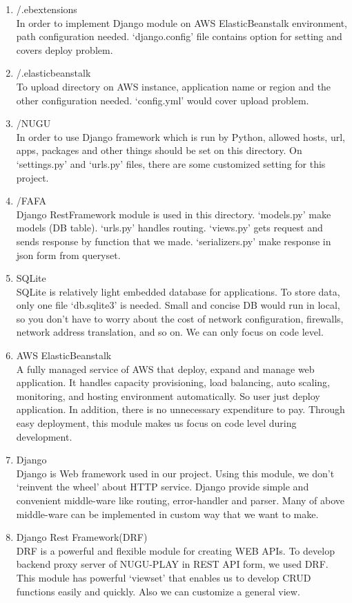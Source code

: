 \documentclass[conference]{IEEEtran}
\begin{document}
\begin{enumerate}
    \item /.ebextensions\\
    In order to implement Django module on AWS ElasticBeanstalk environment, path configuration needed. ‘django.config’ file contains option for setting and covers deploy problem.\\
    \item /.elasticbeanstalk\\
    To upload directory on AWS instance, application name or region and the other configuration needed. ‘config.yml’ would cover upload problem.\\
    \item /NUGU\\
    In order to use Django framework which is run by Python, allowed hosts, url, apps, packages and other things should be set on this directory. On ‘settings.py’ and ‘urls.py’ files, there are some customized setting for this project.\\
    \item /FAFA\\
    Django RestFramework module is used in this directory. ‘models.py’ make models (DB table). ‘urls.py’ handles routing. ‘views.py’ gets request and sends response by function that we made. ‘serializers.py’ make response in json form from queryset.\\
    \item SQLite\\
    SQLite is relatively light embedded database for applications. To store data, only one file ‘db.sqlite3’ is needed. Small and concise DB would run in local, so you don’t have to worry about the cost of network configuration, firewalls, network address translation, and so on. We can only focus on code level.\\
    \item AWS ElasticBeanstalk\\
    A fully managed service of AWS that deploy, expand and manage web application. It handles capacity provisioning, load balancing, auto scaling, monitoring, and hosting environment automatically. So user just deploy application. In addition, there is no unnecessary expenditure to pay. Through easy deployment, this module makes us focus on code level during development. \\
    \item Django\\
    Django is Web framework used in our project. Using this module, we don’t ‘reinvent the wheel’ about HTTP service. Django provide simple and convenient middle-ware like routing, error-handler and parser. Many of above middle-ware can be implemented in custom way that we want to make.\\
    \item Django Rest Framework(DRF)\\
    DRF is a powerful and flexible module for creating WEB APIs. To develop backend proxy server of NUGU-PLAY in REST API form, we used DRF. This module has powerful ‘viewset’ that enables us to develop CRUD functions easily and quickly. Also we can customize a general view. 
\end{enumerate}
\end{document}

